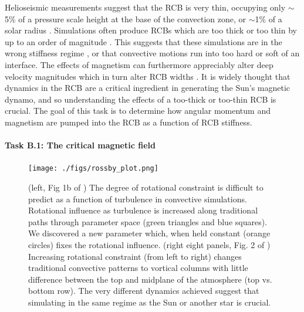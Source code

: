 \documentclass[11pt, preprint]{aastex}
\begin{document}
Helioseismic measurements suggest that the RCB is very thin, occupying only $\sim$5\% of a pressure scale height at the base of the convection zone, or $\sim$1\% of a solar radius \citep{basu1997}.
Simulations often produce RCBs which are too thick or too thin by up to an order of magnitude \citep[see e.g.,][]{hotta2017, kapyla2018}.
This suggests that these simulations are in the wrong stiffness regime \citep{brummell&all2002, couston&all2017}, or that convective motions run into too hard or soft of an interface.
The effects of magnetism can furthermore appreciably alter deep velocity magnitudes which in turn alter RCB widths \citep{hotta&all2015}.
It is widely thought that dynamics in the RCB are a critical ingredient in generating the Sun's magnetic dynamo, and so understanding the effects of a too-thick or too-thin RCB is crucial.
The goal of this task is to determine how angular momentum and magnetism are pumped into the RCB as a function of RCB stiffness.



\vspace{-0.5cm}
\paragraph{Task B.1: The critical magnetic field}
\label{sct:taskB1}
\begin{figure}[t!]
    \texttt{[image: ./figs/rossby\_plot.png]}
	\vspace{-1cm}
    \caption{(left, Fig 1b of \citet{anders&all2019}) The degree of rotational constraint is difficult to predict as a function of turbulence in convective simulations.
	Rotational influence as turbulence is increased along traditional paths through parameter space (green triangles and blue squares).
	We discovered a new parameter which, when held constant (orange circles) fixes the rotational influence.
	(right eight panels, Fig. 2 of \citet{anders&all2019}) Increasing rotational constraint (from left to right) changes traditional convective patterns to vortical columns with little difference between the top and midplane of the atmosphere (top vs. bottom row).
	The very different dynamics achieved suggest that simulating in the same regime as the Sun or another star is crucial.
	\label{fig:rossby_plot} }
	\vspace{-0.3cm}
\end{figure}
\end{document}
